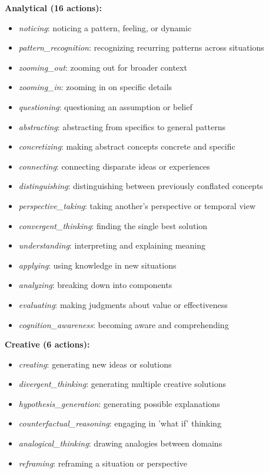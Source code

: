 \documentclass[letterpaper]{article}
\begin{document}
\textbf{Analytical (16 actions):}
\begin{itemize}
    \item \textit{noticing}: noticing a pattern, feeling, or dynamic
    \item \textit{pattern\_recognition}: recognizing recurring patterns across situations
    \item \textit{zooming\_out}: zooming out for broader context
    \item \textit{zooming\_in}: zooming in on specific details
    \item \textit{questioning}: questioning an assumption or belief
    \item \textit{abstracting}: abstracting from specifics to general patterns
    \item \textit{concretizing}: making abstract concepts concrete and specific
    \item \textit{connecting}: connecting disparate ideas or experiences
    \item \textit{distinguishing}: distinguishing between previously conflated concepts
    \item \textit{perspective\_taking}: taking another's perspective or temporal view
    \item \textit{convergent\_thinking}: finding the single best solution
    \item \textit{understanding}: interpreting and explaining meaning
    \item \textit{applying}: using knowledge in new situations
    \item \textit{analyzing}: breaking down into components
    \item \textit{evaluating}: making judgments about value or effectiveness
    \item \textit{cognition\_awareness}: becoming aware and comprehending
\end{itemize}

\textbf{Creative (6 actions):}
\begin{itemize}
    \item \textit{creating}: generating new ideas or solutions
    \item \textit{divergent\_thinking}: generating multiple creative solutions
    \item \textit{hypothesis\_generation}: generating possible explanations
    \item \textit{counterfactual\_reasoning}: engaging in 'what if' thinking
    \item \textit{analogical\_thinking}: drawing analogies between domains
    \item \textit{reframing}: reframing a situation or perspective
\end{itemize}
\end{document}
